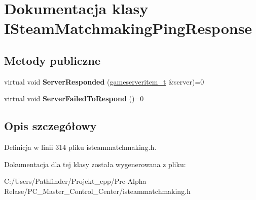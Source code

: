 \hypertarget{class_i_steam_matchmaking_ping_response}{}\section{Dokumentacja klasy I\+Steam\+Matchmaking\+Ping\+Response}
\label{class_i_steam_matchmaking_ping_response}
\subsection*{Metody publiczne}
\begin{DoxyCompactItemize}
\item 
\mbox{\label{class_i_steam_matchmaking_ping_response_a5b6143aadde3fc7092afc404036b2185}} 
virtual void {\bfseries Server\+Responded} (\hyperlink{classgameserveritem__t}{gameserveritem\+\_\+t} \&server)=0
\item 
\mbox{\label{class_i_steam_matchmaking_ping_response_a08ec212599b9d76512a98ce9f90c69c8}} 
virtual void {\bfseries Server\+Failed\+To\+Respond} ()=0
\end{DoxyCompactItemize}


\subsection{Opis szczegółowy}


Definicja w linii 314 pliku isteammatchmaking.\+h.



Dokumentacja dla tej klasy została wygenerowana z pliku\+:\begin{DoxyCompactItemize}
\item 
C\+:/\+Users/\+Pathfinder/\+Projekt\+\_\+cpp/\+Pre-\/\+Alpha Relase/\+P\+C\+\_\+\+Master\+\_\+\+Control\+\_\+\+Center/isteammatchmaking.\+h\end{DoxyCompactItemize}
